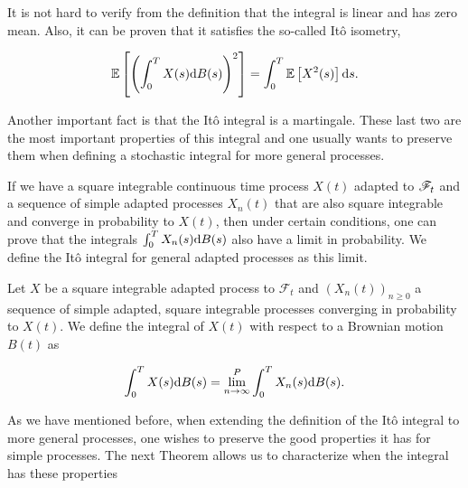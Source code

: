 It is not hard to verify from the definition that the integral is linear and has zero mean. Also, it can be proven that it satisfies the so-called Itô isometry,

\begin{equation*}
    \mathbb E \left[  \left( \int_0^T X(s) \mathrm d B(s)\right)^2  \right] = \int_0^T \mathbb E \left[ X^2(s) \right] \mathrm d s.
\end{equation*}

Another important fact is that the Itô integral is a martingale. These last two are the most important properties of this integral and one usually wants to preserve them when defining a stochastic integral for more general processes. 

If we have a square integrable continuous time process $X(t)$ adapted to $\mathscr F_t$ and a sequence of simple adapted processes $X_n(t)$ that are also square integrable and converge in probability to $X(t)$, then under certain conditions, one can prove that the integrals $\int_0^T X_n(s)\mathrm d B(s)$ also have a limit in probability. We define the Itô integral for general adapted processes as this limit.

\begin{definition}
    Let $X$ be a square integrable adapted process to $\mathscr F_t$ and $(X_n(t))_{n\ge 0}$ a sequence of simple adapted, square integrable processes converging in probability to $X(t)$. We define the integral of $X(t)$ with respect to a Brownian motion $B(t)$ as

    \begin{equation*}
        \int_0^T X(s) \mathrm d B(s) = \lim_{n\to\infty}^P \int_0^T X_n(s) \mathrm d B(s).
    \end{equation*}
\end{definition}

As we have mentioned before, when extending the definition of the Itô integral to more general processes, one wishes to preserve the good properties it has for simple processes. The next Theorem allows us to characterize when the integral has these properties

